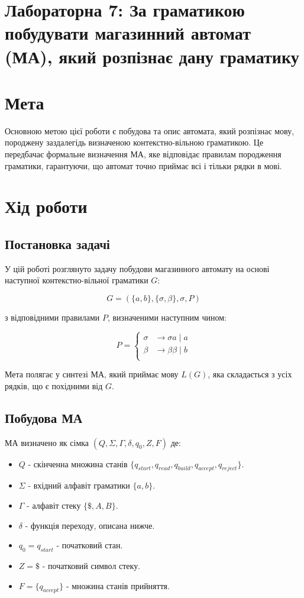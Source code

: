 \documentclass[12pt,a4paper]{article}
\begin{document}
\section*{Лабораторна 7: За граматикою побудувати магазинний автомат (МА), який розпізнає дану граматику }

\section*{Мета}
Основною метою цієї роботи є побудова та опис автомата, який розпізнає мову, породжену заздалегідь визначеною контекстно-вільною граматикою. Це передбачає формальне визначення МА, яке відповідає правилам породження граматики, гарантуючи, що автомат точно приймає всі і тільки рядки в мові.

\section*{Хід роботи}

\subsection*{Постановка задачі}
У цій роботі розглянуто задачу побудови магазинного автомату на основі наступної контекстно-вільної граматики \( G \):

\[ G = (\{a, b\}, \{\sigma, \beta\}, \sigma, P) \]

з відповідними правилами \( P \), визначеними наступним чином:

\[ P = \left\{ \begin{array}{cl}
\sigma & \rightarrow \sigma a \;|\; a \\
\beta & \rightarrow \beta \beta \;|\; b \\
\end{array} \right. \]

Мета полягає у синтезі МА, який приймає мову \( L(G) \), яка складається з усіх рядків, що є похідними від \( G \).

\subsection*{Побудова МА}
МА визначено як сімка \( (Q, \Sigma, \Gamma, \delta, q_0, Z, F) \) де:

\begin{itemize}
    \item \( Q \) - скінченна множина станів \(\{q_{start}, q_{read}, q_{build}, q_{accept}, q_{reject}\}\).
    \item \( \Sigma \) - вхідний алфавіт граматики \(\{a, b\}\).
    \item \( \Gamma \) - алфавіт стеку \(\{\$, A, B\}\).
    \item \( \delta \) - функція переходу, описана нижче.
    \item \( q_0 = q_{start} \) - початковий стан.
    \item \( Z = \$ \) - початковий символ стеку.
\item \( F = \{q_{accept}\} \) - множина станів прийняття.
\end{itemize}
\end{document}
